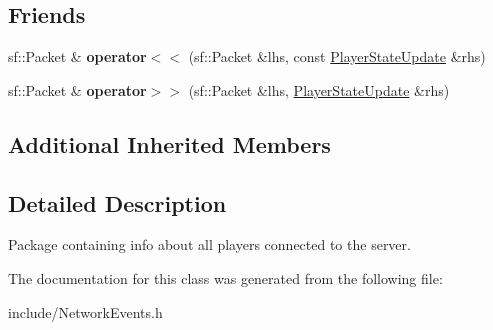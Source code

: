 \subsection*{Friends}
\begin{DoxyCompactItemize}
\item 
\hypertarget{class_player_state_update_a276309adde0b77f085d87e4f80537576}{sf\-::\-Packet \& {\bfseries operator$<$$<$} (sf\-::\-Packet \&lhs, const \hyperlink{class_player_state_update}{Player\-State\-Update} \&rhs)}\label{class_player_state_update_a276309adde0b77f085d87e4f80537576}

\item 
\hypertarget{class_player_state_update_a096b592daeee8ee7932d8989074149f9}{sf\-::\-Packet \& {\bfseries operator$>$$>$} (sf\-::\-Packet \&lhs, \hyperlink{class_player_state_update}{Player\-State\-Update} \&rhs)}\label{class_player_state_update_a096b592daeee8ee7932d8989074149f9}

\end{DoxyCompactItemize}
\subsection*{Additional Inherited Members}


\subsection{Detailed Description}
Package containing info about all players connected to the server. 



The documentation for this class was generated from the following file\-:\begin{DoxyCompactItemize}
\item 
include/Network\-Events.\-h\end{DoxyCompactItemize}
